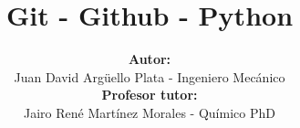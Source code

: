 \documentclass[20]{beamer}
\title[ACMA]{\textbf{Git - Github - Python}}
\author[Juan David]{
\textbf{Autor:}\\
Juan David Argüello Plata - Ingeniero Mecánico\\
\vspace{5pt}
\textbf{Profesor tutor:}\\
Jairo René Martínez Morales - Químico PhD
}
\institute[UIS]{
	CENIVAM\\
	Universidad Industrial de Santander
}
\date{}
\begin{document}
\begin{frame}
\titlepage
\end{frame}











\end{document}
